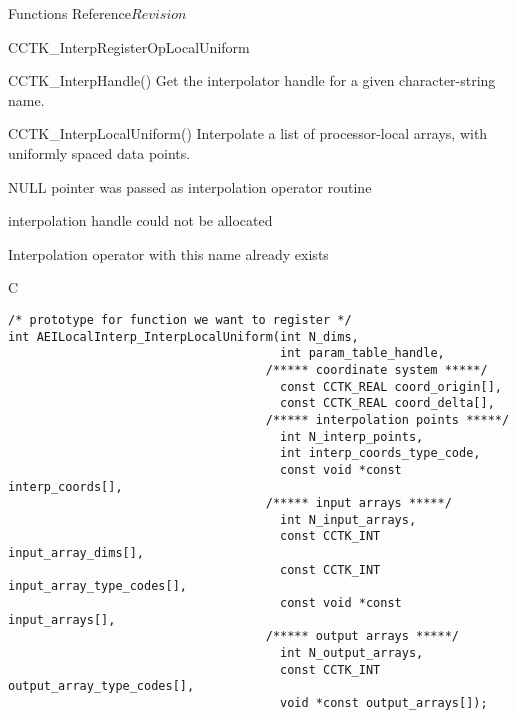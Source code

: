 \begin{cactuspart}{ Functions Reference}{}{$Revision$}
\begin{FunctionDescription}{CCTK\_InterpRegisterOpLocalUniform}
\begin{SeeAlsoSection}
\begin{SeeAlso}{CCTK\_InterpHandle()}
Get the interpolator handle for a given character-string name.
\end{SeeAlso}
\begin{SeeAlso}{CCTK\_InterpLocalUniform()}
Interpolate a list of processor-local arrays, with uniformly spaced
data points.
\end{SeeAlso}
\end{SeeAlsoSection}

\begin{ErrorSection}
\begin{Error}{-1}
NULL pointer was passed as interpolation operator routine
\end{Error}
\begin{Error}{-2}
interpolation handle could not be allocated
\end{Error}
\begin{Error}{-3}
Interpolation operator with this name already exists
\end{Error}
\end{ErrorSection}

\begin{ExampleSection}
\begin{Example}{C}
\begin{verbatim}
/* prototype for function we want to register */
int AEILocalInterp_InterpLocalUniform(int N_dims,
                                      int param_table_handle,
                                    /***** coordinate system *****/
                                      const CCTK_REAL coord_origin[],
                                      const CCTK_REAL coord_delta[],
                                    /***** interpolation points *****/
                                      int N_interp_points,
                                      int interp_coords_type_code,
                                      const void *const interp_coords[],
                                    /***** input arrays *****/
                                      int N_input_arrays,
                                      const CCTK_INT input_array_dims[],
                                      const CCTK_INT input_array_type_codes[],
                                      const void *const input_arrays[],
                                    /***** output arrays *****/
                                      int N_output_arrays,
                                      const CCTK_INT output_array_type_codes[],
                                      void *const output_arrays[]);


\end{verbatim}
\end{Example}
\end{ExampleSection}
\end{FunctionDescription}
\end{cactuspart}
